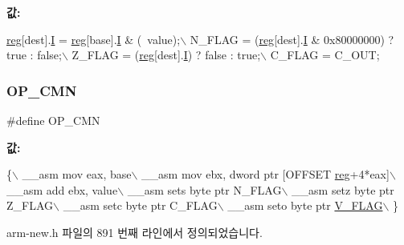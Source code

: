 {\bfseries 값\+:}
\begin{DoxyCode}
\mbox{\hyperlink{_g_b_a_8h_ae29faba89509024ffd1a292badcedf2d}{reg}}[dest].\mbox{\hyperlink{unionreg__pair_a9f6a42d56c07829d7013571eda998252}{I}} = \mbox{\hyperlink{_g_b_a_8h_ae29faba89509024ffd1a292badcedf2d}{reg}}[base].\mbox{\hyperlink{unionreg__pair_a9f6a42d56c07829d7013571eda998252}{I}} & (~value);\(\backslash\)
    N\_FLAG = (\mbox{\hyperlink{_g_b_a_8h_ae29faba89509024ffd1a292badcedf2d}{reg}}[dest].\mbox{\hyperlink{unionreg__pair_a9f6a42d56c07829d7013571eda998252}{I}} & 0x80000000) ? \textcolor{keyword}{true} : \textcolor{keyword}{false};\(\backslash\)
    Z\_FLAG = (\mbox{\hyperlink{_g_b_a_8h_ae29faba89509024ffd1a292badcedf2d}{reg}}[dest].\mbox{\hyperlink{unionreg__pair_a9f6a42d56c07829d7013571eda998252}{I}}) ? \textcolor{keyword}{false} : \textcolor{keyword}{true};\(\backslash\)
    C\_FLAG = C\_OUT;
\end{DoxyCode}
\mbox{\label{arm-new_8h_ad77375d5b6804046efff797e51dea7c3}} 
\subsubsection{\texorpdfstring{O\+P\+\_\+\+C\+MN}{OP\_CMN}\hspace{0.1cm}{\footnotesize\ttfamily [1/2]}}
{\footnotesize\ttfamily \#define O\+P\+\_\+\+C\+MN}

{\bfseries 값\+:}
\begin{DoxyCode}
\{\(\backslash\)
       \_\_asm mov eax, base\(\backslash\)
       \_\_asm mov ebx, dword ptr [OFFSET \mbox{\hyperlink{_g_b_a_8h_ae29faba89509024ffd1a292badcedf2d}{reg}}+4*eax]\(\backslash\)
       \_\_asm add ebx, value\(\backslash\)
       \_\_asm sets byte ptr N\_FLAG\(\backslash\)
       \_\_asm setz byte ptr Z\_FLAG\(\backslash\)
       \_\_asm setc byte ptr C\_FLAG\(\backslash\)
       \_\_asm seto byte ptr \mbox{\hyperlink{_g_b_a_8h_a11a0e7b14a93be5eb2720b0151900919}{V\_FLAG}}\(\backslash\)
     \}
\end{DoxyCode}


arm-\/new.\+h 파일의 891 번째 라인에서 정의되었습니다.

\mbox{\label{_g_b_a_8cpp_ad77375d5b6804046efff797e51dea7c3}} 
